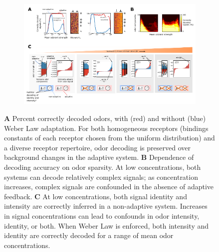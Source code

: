 \begin{figure}
	\centering
	\begin{subfigure}[t]{0.85\linewidth}
		\includegraphics[width=\textwidth]{figures/Figures_signal_decoding_weber_law}
		\label{fig:decoding_a}
	\end{subfigure}
	\begin{subfigure}[t]{0\linewidth}
		\label{fig:decoding_b}
	 \end{subfigure}
	\begin{subfigure}[t]{0\linewidth}
		\label{fig:decoding_c}
	\end{subfigure}
\caption{\footnotesize{\textbf{A} Percent correctly decoded odors, with (red) and without (blue) Weber Law adaptation. For both homogeneous receptors (bindings constants of each receptor chosen from the uniform distribution) and a diverse receptor repertoire, odor decoding is preserved over background changes in the adaptive system. \textbf{B} Dependence of decoding accuracy on odor sparsity. At low concentrations, both systems can decode relatively complex signals; as concentration increases, complex signals are confounded in the absence of adaptive feedback. \textbf{C} At low concentrations, both signal identity and intensity are correctly inferred in a non-adaptive system. Increases in signal concentrations can lead to confounds in odor intensity, identity, or both. When Weber Law is enforced, both intensity and identity are correctly decoded for a range of mean odor concentrations.}}
\label{fig:decoding}
\end{figure}


